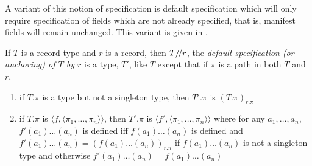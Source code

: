 \begin{shaded}
A variant of this notion of specification is default specification
which will only require specification of fields which are not already
specified, that is, manifest fields will remain unchanged. This
variant is given in \nexteg{}.
  \begin{ex} 
  If $T$ is a record type and $r$ is a record, then $T/\!/ r$,  the
\textit{default specification (or anchoring) of $T$ by
$r$} is a type, $T'$, like $T$ except that if $\pi$ is a path in both
$T$ and $r$,  
\begin{enumerate}
\item  if
$T.\pi$ is a type but not a singleton type, then $T'.\pi$ is $(T.\pi)_{r.\pi}$ 

\item if $T.\pi$ is $\langle f,\langle\pi_1,\ldots,\pi_n\rangle\rangle$, then
  $T'.\pi$ is $\langle f',\langle\pi_1,\ldots,\pi_n\rangle\rangle$ where for any
  $a_1,\ldots,a_n$, $f'(a_1)\ldots(a_n)$ is defined iff
  $f(a_1)\ldots(a_n)$ is defined  and $f'(a_1)\ldots(a_n) =
  (f(a_1)\ldots(a_n))_{r.\pi}$ if $f(a_1)\ldots(a_n)$ is not a
  singleton type and otherwise $f'(a_1)\ldots(a_n) = f(a_1)\ldots(a_n)$ 
\end{enumerate}
\end{ex}



\end{shaded}
